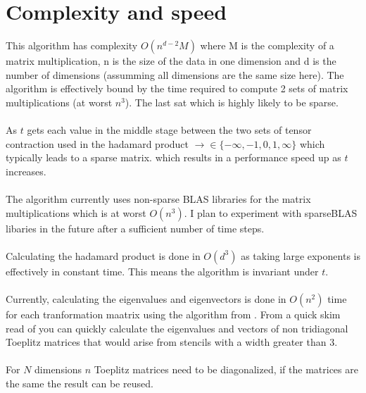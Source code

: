 \documentclass{article}
\begin{document}
\section{Complexity and speed}
This algorithm has complexity $O(n^{d-2} M)$ where M is the complexity of a matrix multiplication, n is the size of the data in one dimension and d is the number of dimensions (assumming all dimensions are the same size here). 
The algorithm is effectively bound by the time required to compute 2 sets of matrix multiplications (at worst $n^3$). The last sat which is highly likely to be sparse. \\ \\
As $t$ gets each value in the middle stage between the two sets of tensor contraction used in the hadamard product $\rightarrow \in \{- \infty, -1, 0, 1, \infty\}$ which typically leads to a sparse matrix. 
which results in a performance speed up as $t$ increases.\\ \\
The algorithm currently uses non-sparse BLAS libraries for the matrix multiplications which is at worst $O(n^3)$. 
I plan to experiment with sparseBLAS libaries in the future after a sufficient number of time steps.  \\ \\
Calculating the hadamard product is done in $O(d^3)$ as taking large exponents is effectively in constant time. 
This means the algorithm is invariant under $t$. \\ \\ 
Currently, calculating the eigenvalues and eigenvectors is done in $O(n^2)$ time for each tranformation maatrix using the algorithm from \cite{noschese2013tridiagonal}.
From a quick skim read of \cite{bogoya2022fast} you can quickly calculate the eigenvalues and vectors of non tridiagonal Toeplitz 
matrices that would arise from stencils with a width greater than 3. \\ \\
For $N$ dimensions $n$ Toeplitz matrices need to be diagonalized, if the matrices are the same the result can be reused. 
\end{document}
